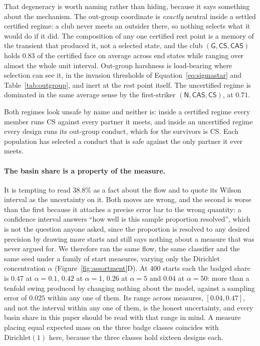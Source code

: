 \documentclass[preprint,12pt]{elsarticle}
\theoremstyle{plain}
\theoremstyle{definition}
\newcommand{\CS}{\textsf{CS}}
\newcommand{\CAS}{\textsf{CAS}}
\begin{document}
That degeneracy is worth naming rather than hiding, because it says something
about the mechanism. The out-group coordinate is \emph{exactly} neutral inside
a settled certified regime: a club never meets an outsider there, so nothing
selects what it would do if it did. The composition of any one certified rest
point is a memory of the transient that produced it, not a selected state, and
the club $(\mathsf{G}, \CS, \CAS)$ holds $0.83$ of the certified face on
average across end states while ranging over almost the whole unit interval.
Out-group harshness is load-bearing where selection can see it, in the invasion
thresholds of Equation~\eqref{eq:sigmastar} and Table~\ref{tab:outgroup}, and
inert at the rest point itself. The uncertified regime is dominated in the same
average sense by the first-striker $(\mathsf{N}, \CAS, \CS)$, at $0.71$.

Both regimes look unsafe by name and neither is: inside a certified regime
every member runs \CS{} against every partner it meets, and inside an
uncertified regime every design runs its out-group conduct, which for the
survivors is \CS{}. Each population has selected a conduct that is safe against
the only partner it ever meets.

\paragraph{The basin share is a property of the measure.}
It is tempting to read $38.8\%$ as a fact about the flow and to quote its
Wilson interval as the uncertainty on it. Both moves are wrong, and the second
is worse than the first because it attaches a precise error bar to the wrong
quantity: a confidence interval answers ``how well is this sample proportion
resolved'', which is not the question anyone asked, since the proportion is
resolved to any desired precision by drawing more starts and still says nothing
about a measure that was never argued for. We therefore ran the same flow, the
same classifier and the same seed under a family of start measures, varying
only the Dirichlet concentration $\alpha$ (Figure~\ref{fig:assortment}D). At
$400$ starts each the badged share is $0.47$ at $\alpha = 0.1$, $0.42$ at
$\alpha = 1$, $0.26$ at $\alpha = 5$ and $0.04$ at $\alpha = 50$: more than a
tenfold swing produced by changing nothing about the model, against a sampling
error of $0.025$ within any one of them. Its range
across measures, $[0.04, 0.47]$, and not the interval within any one of them,
is the honest uncertainty, and every basin share in this paper should be read
with that range in mind. A measure placing equal expected mass on the three
badge classes coincides with $\mathrm{Dirichlet}(1)$ here, because the three
classes hold sixteen designs each.
\end{document}
